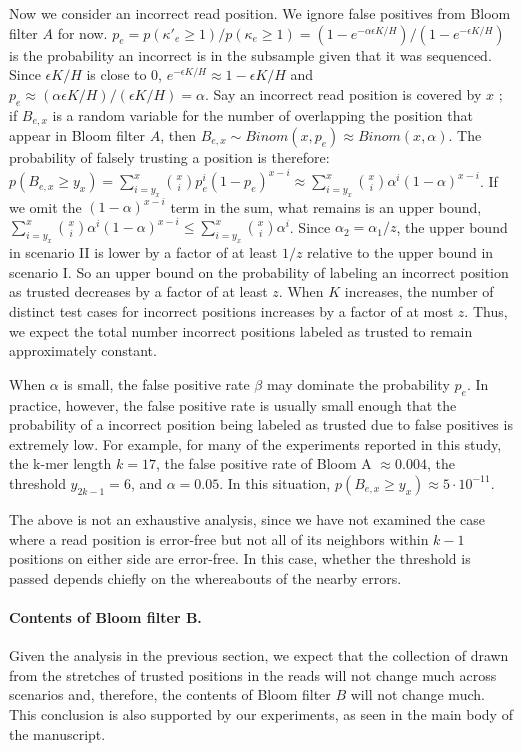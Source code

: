 \documentclass[10pt]{article}
\begin{document}
Now we consider an incorrect read position.  We ignore false positives from Bloom filter $A$ for now.
$p_e = p(\kappa'_e\ge 1)/p(\kappa_e\ge 1) = (1-e^{-\alpha\epsilon K/H})/(1-e^{-\epsilon K/H})$ is the probability an incorrect \kmer is in the subsample given that it was sequenced.
Since $\epsilon K/H$ is close to 0, $e^{-\epsilon K/H}\approx 1-\epsilon K/H$ and $p_e \approx (\alpha \epsilon K/H)/(\epsilon K/H)=\alpha$.
Say an incorrect read position is covered by $x$ \kmers; if $B_{e,x}$ is a random variable for the number of \kmers overlapping the position that appear in Bloom filter $A$, then $B_{e,x} \sim Binom(x, p_e) \approx Binom(x, \alpha)$.  The probability of falsely trusting a position is therefore: 
$p(B_{e, x}\geq y_x)=\sum_{i=y_x}^x \binom{x}{i} p_e^i(1-p_e)^{x-i} \approx \sum_{i=y_x}^x \binom{x}{i} \alpha^i(1-\alpha)^{x-i}$.  If we omit the $(1-\alpha)^{x-i}$ term in the sum, what remains is an upper bound, \thatis $\sum_{i=y_x}^x \binom{x}{i} \alpha^i(1-\alpha)^{x-i} \leq \sum_{i=y_x}^x \binom{x}{i} \alpha^i$.  Since $\alpha_2 = \alpha_1/z$, the upper bound in scenario II is lower by a factor of at least $1/z$ relative to the upper bound in scenario I.  So an upper bound on the probability of labeling an incorrect position as trusted decreases by a factor of at least $z$.  When $K$ increases, the number of distinct test cases for incorrect positions increases by a factor of at most $z$.  Thus, we expect the total number incorrect positions labeled as trusted to remain approximately constant.

When $\alpha$ is small, the false positive rate $\beta$ may dominate the probability $p_e$.  In practice, however, the false positive rate is usually small enough that the probability of a incorrect position being labeled as trusted due to false positives is extremely low.  For example, for many of the experiments reported in this study, the k-mer length $k=17$, the false positive rate of Bloom A $\approx 0.004$, the threshold $y_{2k-1} = 6$, and $\alpha = 0.05$.  In this situation, $p(B_{e, x}\geq y_x) \approx 5 \cdot 10^{-11}.$

The above is not an exhaustive analysis, since we have not examined the case where a read position is error-free but not all of its neighbors within $k-1$ positions on either side are error-free.  In this case, whether the threshold is passed depends chiefly on the whereabouts of the nearby errors.

\paragraph{Contents of Bloom filter B.}
Given the analysis in the previous section, we expect that the collection of \kmers drawn from the stretches of trusted positions in the reads will not change much across scenarios and, therefore, the contents of Bloom filter $B$ will not change much.  This conclusion is also supported by our experiments, as seen in the main body of the manuscript.
\end{document}
